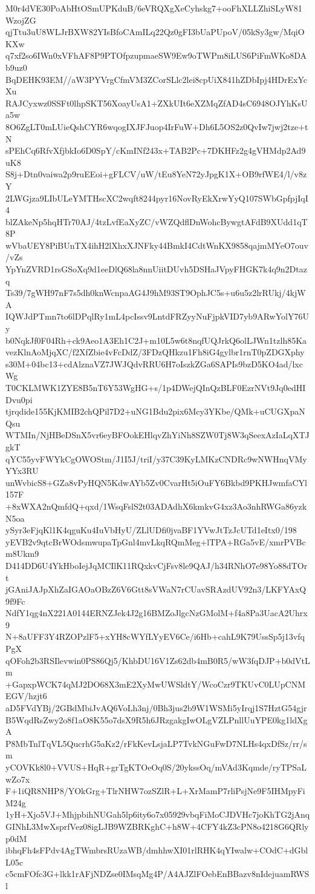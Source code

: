 M0r4dVE30PoAbHtOSmUPKduB/6eVRQXgXeCyhskg7+ooFhXLLZhiSLyW81WzojZG
qjTtu3uU8WLJrBXW82YIsBfoCAmILq22Qz0gFI3bUaPUpoV/05kSy3gw/MqiOKXw
q7xf2so6IWn0xVFhAF8P9PTOfpzupmaeSW9Ew9oTWPm8iLUS6PiFmWKo8DAb9uz0
BqDEHK93EM//aW3PYVrgCfmVM3ZCorSLlc2lei8cpUiX841hZDbIpj4HDrExYcXu
RAJCyxwz0SSFt0lhpSKT56XoayUsA1+ZXkUIt6eXZMqZfAD4sC6948OJYhKsUa5w
8O6ZgLT0mLUieQshCYR6wqogIXJFJuop4IrFuW+Dh6L5OS2z0QvIw7jwj2tze+tN
sPEhCq6RfvXfjbkIo6D0SpY/cKmINf243x+TAB2Pc+7DKHFz2g4gVHMdp2Ad9uK8
S8j+Dtn0vaiwa2p9ruEEoi+gFLCV/uW/tEu8YeN72yJpgK1X+OB9rfWE4/l/v8zY
2LWGjza9LIbULeYMTHscXC2wqft8244pyr16NovRyEkXrwYyQ107SWbGpfpjIqI4
blZAkeNp5hqHTr70AJ/4tzLvfEaXyZC/vWZQdflDnWohcBywgtAFdB9XUdd1qT8P
wVbaUEY8PiBUnTX4ihH2lXhxXJNFky44BmkI4CdtWnKX9858qajmMYeO7ouv/vZs
YpYnZVRD1rsGSoXq9d1eeDlQ68la8nnUiitDUvh5DSHaJVpyFHGK7k4q9n2Dtazq
Ts39/7gWH97nF7s5dh0knWcnpaAG4J9hM93ST9OphJC5s+u6u5z2lrRUkj/4kjWA
IQWJdPTmn7to6lDPqlRy1mL4pcIssv9LntdFRZyyNuFjpkVID7yb9ARwYolY76Uy
b0NqkJf0F04Rh+ck9Aeo1A3Eh1C2J+m10L5w6t8nqfUQJrkQ6olLJWn1tzlh85Ka
vezKlnAoMjqXC/f2XfZbie4vFcDdZ/3FDzQHkzu1Fh8iG4gylbr1rnT0pZDGXphy
s30M+04bc13+cdAlznaVZ7JWJQdvRRU6H7oIszkZGa6SAPIs9bzD5KO4ad/lxcWg
T0CKLMWK1ZYE8B5nT6Y53WgHG+s/1p4DWejQInQzBLF0EzrNVt9Jq0edHIDvu0pi
tjrqdide155KjKMIB2chQPil7D2+uNG1Bdu2pix6Mcy3YKbe/QMk+uCUGXpaNQsu
WTMIn/NjHBeDSnX5vr6eyBFOokEHlqvZhYiNh8SZW0Tj8W3qSeexAzIaLqXTJgkT
qYC55yvFWYkCgOWOStm/J1I5J/triI/y37C39KyLMKzCNDRc9wNWHnqVMyYYx3RU
unWvbicS8+GZa8vPyHQN5KdwAYb5Zv0CvarHt5iOuFY6Bkbd9PKHJwmfaCYl157F
+8xWXA2nQmfdQ+qxd/1WsqFslS2t03ADAdhX6kmkvG4xz3Ao3nhRWGa86yzkN5oa
ySyr3eFjqKl1K4qguKu4IuVbHyU/ZLlUDfi0jvaBF1YVwJtTzJcUTd1eItx0/198
yEVB2v9qtcBrWOdsmwupaTpGnl4mvLkqRQmMeg+lTPA+RGa5vE/xmrPVBcm8Ukm9
D414DD6U4YkHboIejJqMCIlK11RQxkvCjFsv8le9QAJ/h34RNhO7e98Yo88dTOrt
jGAniJAJpXhZaIGAOaOBzZ6V6Gtt8sVWaN7rCUavSRAzdUV92n3/LKFYAxQ9f9Fc
NdfY1qg4nX221A0144ERNZJek4J2g16BMZoJlgcNzGMolM+f4a8Pa3UacA2Uhrx9
N+8aUFF3Y4RZOPzlF5+xYH8cWYfLYyEV6Ce/i6Hb+cahL9K79UssSp5j13vfqPgX
qOFoh2b3RSIlevwin0PS86Qj5/KhbDU16V1Zs62db4mB0R5/wW3fqDJP+b0dVtLm
+GapxpWCK74qMJ2DO68X3mE2XyMwUWSldtY/WcoCzr9TKUvC0LUpCNMEGV/hzjt6
aD5FVdYBj/2GBdMbiJvAQ6VoLh3nj/0Bh3jus2b9W1WSMi5yIrqj1S7HztG54gjr
B5WqdRsZwy2o8f1aO8K55o7dsX9R5h6JRzgakgIwOLgVZLPnllUuYPE0kg1ldXgA
P8MbTnlTqVL5QucrhG5aKz2/rFkKevLsjaLP7TvkNGuFwD7NLHs4qxDfSz/rr/sm
yCOVKk8l0+VVUS+HqR+grTgKTOeOq0S/20ykssOq/mVAd3Kqmde/ryTPSaLwZo7x
F+1iQR8NHP8/YOkGrg+TlrNHW7ozSZlR+L+XrMamP7rliPsjNe9F5IHMpyFiM24g
1yH+Xjo5VJ+MhjpbihNUGah5lp6ity6o7x05929vbqFiMoCJDVHc7joKhTG2jAnq
GINhL3MwXsprfVez08igLJB9WZBRKghC+h8W+4CFY4kZ3cPN8o4218G6QRlyp0dM
ibhqFh4sFPdv4AgTWmbrsRUzaWB/dmhhwXI01rlRHK4qYIwalw+COdC+dGblL05c
c5cmFOfc3G+lkk1rAFjNDZse0IMsqMg4P/A4AJZlFOebEnBBazv8nIdejuamRWSl
